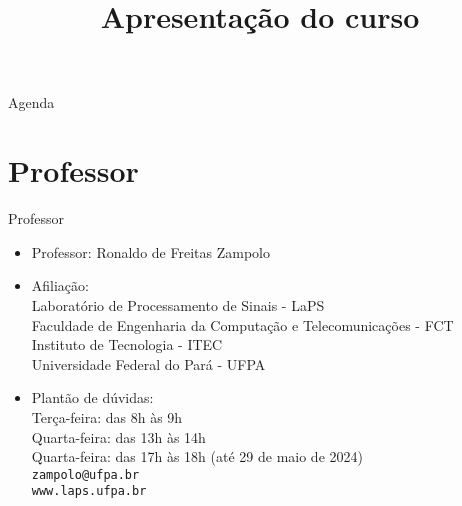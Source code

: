 


\title{\cursogrande\\ \vspace{1cm}Apresentação do curso}


   \maketitle[randomdots={false}]
   \begin{slide}{Agenda}
      \tableofcontents[content=sections]
   \end{slide}

   \section[ slide = true]{Professor }
      \begin{slide}[toc=]{Professor}
         \begin{itemize}
            \item Professor: Ronaldo de Freitas Zampolo
            \item Afiliação:\\
                  Laboratório de Processamento de Sinais - LaPS\\
                  Faculdade de Engenharia da Computação e Telecomunicações - FCT\\
                  Instituto de Tecnologia - ITEC\\
                  Universidade Federal do Pará - UFPA\\
            \item Plantão de dúvidas:\\
		  Terça-feira: das 8h às 9h\\
	          Quarta-feira: das 13h às 14h\\
	          Quarta-feira: das 17h às 18h (até 29 de maio de 2024)\\
                  \texttt{zampolo@ufpa.br}\\ 
                  \texttt{www.laps.ufpa.br}
         \end{itemize}
      \end{slide}
      

